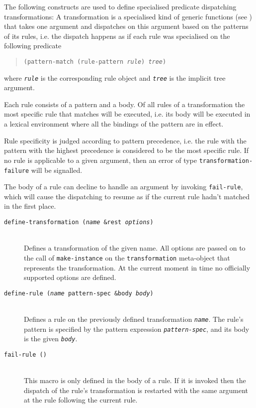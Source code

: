 \documentclass[a4paper,11pt]{scrartcl}
\begin{document}
The following constructs are used to define specialised predicate
dispatching transformations:  A transformation is a specialised kind
of generic functions (see \cite{CLOS,AMOP}) that takes one argument
and dispatches on this argument based on the patterns of its rules,
i.e. the dispatch happens as if each rule was specialised on the
following predicate 
\begin{quote}
  \texttt{(pattern-match (rule-pattern \textsl{rule}) \textsl{tree})}
\end{quote}
where \texttt{\textsl{rule}} is the corresponding rule object and
\texttt{\textsl{tree}} is the implicit tree argument.

Each rule consists of a pattern and a body.  Of all rules of a
transformation the most specific rule that matches will be executed,
i.e. its body will be executed in a lexical environment where all the
bindings of the pattern are in effect.

Rule specificity is judged according to pattern precedence,
i.e. the rule with the pattern with the highest precedence is
considered to be the most specific rule.  If no rule is applicable to
a given argument, then an error of type
\texttt{transformation-failure} will be signalled. 

The body of a rule can decline to handle an argument by invoking
\texttt{fail-rule}, which will cause the dispatching to resume as if
the current rule hadn't matched in the first place.

\begin{description}
\item[\texttt{define-transformation
    (\textsl{name} \&rest \textsl{options})}]
  \hspace{2cm}\\[2ex]
  Defines a transformation of the given name.  All options are passed
  on to the call of \texttt{make-instance} on the
  \texttt{transformation} meta-object that represents the
  transformation.  At the current moment in time no officially
  supported options are defined.
\item[\texttt{define-rule
    (\textsl{name} \texttt{pattern-spec} \&body \textsl{body})}]
  \hspace{2cm}\\[2ex]
  Defines a rule on the previously defined transformation
  \texttt{\textsl{name}}.  The rule's pattern is specified by the
  pattern expression \texttt{\textsl{pattern-spec}}, and its body is
  the given \texttt{\textsl{body}}.
\item[\texttt{fail-rule ()}]\hspace{2cm}\\[2ex]
  This macro is only defined in the body of a rule.  If it is invoked
  then the dispatch of the rule's transformation is restarted with the
  same argument at the rule following the current rule.
\end{description}
\end{document}
